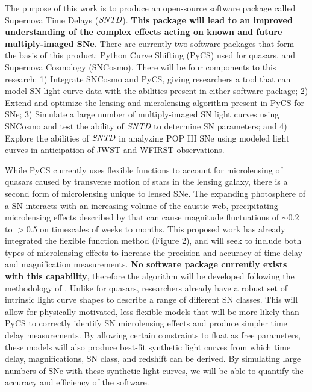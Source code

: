 The purpose of this work is to produce an open-source software
package called Supernova Time Delays ($\textit{SNTD}$). \textbf{This package will
lead to an improved understanding of the complex effects acting on 
known and future multiply-imaged SNe.}
There are currently two software packages that form the basis 
of this product: Python Curve Shifting (PyCS) used for quasars, and Supernova Cosmology 
(SNCosmo). There will be four components to this research: 1) Integrate 
SNCosmo and PyCS, giving researchers a tool
that can model SN light curve data with the abilities present in either
software package; 2) Extend and optimize the lensing and microlensing
algorithm present in PyCS for SNe; 3) Simulate a large number of multiply-imaged SN
light curves using SNCosmo and test the ability of $\textit{SNTD}$ to
determine SN parameters; and 4) Explore the abilities of
$\textit{SNTD}$ in analyzing POP III SNe using modeled light curves in
anticipation of JWST and WFIRST observations.


While PyCS currently uses flexible functions to account for
microlensing of quasars caused by transverse motion of stars in the
lensing galaxy, there is a second form of microlensing unique to
lensed SNe. The expanding photosphere of a SN interacts with an 
increasing volume of the caustic web, precipitating microlensing effects 
described by \cite{Dobler:2006} that can cause magnitude 
fluctuations of $\sim$0.2 to $>$0.5 on timescales of weeks to months. 
This proposed work has already integrated the flexible function method 
(Figure 2), and will seek to include both types of microlensing effects to 
increase the precision and accuracy of time delay and magnification measurements. 
\textbf{No software package currently
exists with this capability}, therefore the algorithm will be developed
following the methodology of \cite{Dobler:2006}. Unlike for quasars, 
researchers already have a robust set of
intrinsic light curve shapes to describe a range of different SN
classes. This will allow for physically motivated, less flexible
models that will be more likely than PyCS to correctly identify SN
microlensing effects and produce simpler time delay measurements.
By allowing certain constraints to float as free parameters,
these models will also produce best-fit synthetic light curves from
which time delay, magnifications, SN class, and redshift can be
derived. By simulating large numbers of SNe with these synthetic light
curves, we will be able to quantify the accuracy and efficiency of the
software.


